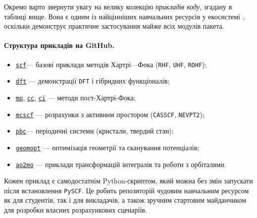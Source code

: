 \noindent
Окремо варто звернути увагу на велику колекцію \emph{прикладів коду},
згадану в таблиці вище. Вона є одним із найцінніших навчальних ресурсів у екосистемі \PySCF,
оскільки демонструє практичне застосування майже всіх модулів пакета.

\paragraph{Структура прикладів на GitHub.}
\begin{itemize}
    \item \href{https://github.com/pyscf/pyscf/tree/master/examples/scf/}{\texttt{scf}}--- базові приклади методів Хартрі---Фока (\texttt{RHF}, \texttt{UHF}, \texttt{ROHF});
    \item \href{https://github.com/pyscf/pyscf/tree/master/examples/dft}{\texttt{dft}} --- демонстрації \texttt{DFT} і гібридних функціоналів;
    \item \href{https://github.com/pyscf/pyscf/tree/master/examples/mp}{\texttt{mp}}, \href{https://github.com/pyscf/pyscf/tree/master/examples/cc}{\texttt{cc}}, \href{https://github.com/pyscf/pyscf/tree/master/examples/ci}{\texttt{ci}} --- методи пост-Хартрі-Фока;
    \item \href{https://github.com/pyscf/pyscf/tree/master/examples/mcscf}{\texttt{mcscf}}  --- розрахунки з активним простором (\texttt{CASSCF}, \texttt{NEVPT2});
    \item \href{https://github.com/pyscf/pyscf/tree/master/examples/pbc}{\texttt{pbc}}--- періодичні системи (кристали, твердий стан);
    \item \href{https://github.com/pyscf/pyscf/tree/master/examples/geomopt}{\texttt{geomopt}} --- оптимізація геометрії та сканування потенціалів;
    \item \href{https://github.com/pyscf/pyscf/tree/master/examples/ao2mo}{\texttt{ao2mo}} --- приклади трансформацій інтегралів та роботи з орбіталями.
\end{itemize}

Кожен приклад є самодостатнім Python-скриптом, який можна без змін запускати після встановлення \texttt{PySCF}.
Це робить репозиторій чудовим навчальним ресурсом як для студентів, так і для викладачів,
а також зручним стартовим майданчиком для розробки власних розрахункових сценаріїв.



